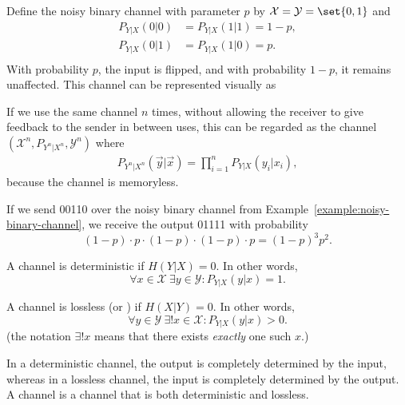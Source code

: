 \begin{example}\label{example:noisy-binary-channel}
Define the noisy binary channel with parameter $p$ by $\mathcal{X} = \mathcal{Y} = \set{0,1}$ and
\begin{align*}
P_{Y|X}(0|0) &= P_{Y|X}(1|1) = 1-p,\\
P_{Y|X}(0|1) &= P_{Y|X}(1|0) = p.\\
\end{align*}
With probability $p$, the input is flipped, and with probability $1-p$, it remains unaffected. This channel can be represented visually as
\begin{center}
\end{center} 
\end{example}
If we use the same channel $n$ times, without allowing the receiver to give feedback to the sender in between uses, this can be regarded as the channel $(\mathcal{X}^n, P_{Y^n|X^n}, \mathcal{Y}^n)$ where
\begin{align}
P_{Y^n|X^n}(\vec{y}|\vec{x}) = \prod_{i=1}^n P_{Y|X}(y_i|x_i),
\end{align}
because the channel is memoryless.
\begin{example}
If we send 00110 over the noisy binary channel from Example~\ref{example:noisy-binary-channel}, we receive the output 01111 with probability
\[
(1-p) \cdot p \cdot (1-p) \cdot (1-p) \cdot p = (1-p)^3p^2.
\]
\end{example}
\begin{definition}
A channel is deterministic if $H(Y|X) = 0$. In other words,
\[
\forall x \in \mathcal{X}\  \exists y \in \mathcal{Y}: P_{Y|X}(y|x) = 1.
\]
\end{definition}
\begin{definition}
A channel is lossless (or ) if $H(X|Y) = 0$. In other words,
\[
\forall y \in \mathcal{Y}\  \exists! x \in \mathcal{X}: P_{Y|X}(y|x) > 0.
\]
(the notation $\exists!x$ means that there exists \emph{exactly} one such $x$.)
\end{definition}
In a deterministic channel, the output is completely determined by the input, whereas in a lossless channel, the input is completely determined by the output.
A  channel is a channel that is both deterministic and lossless.

